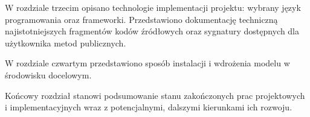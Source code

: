W rozdziale trzecim opisano technologie implementacji projektu: wybrany język programowania oraz frameworki. Przedstawiono dokumentację techniczną najistotniejszych fragmentów kodów źródłowych oraz sygnatury dostępnych dla użytkownika metod publicznych.


W rozdziale czwartym przedstawiono sposób instalacji i wdrożenia modelu w środowisku docelowym.


Końcowy rozdział stanowi podsumowanie stanu zakończonych prac projektowych i implementacyjnych  wraz z potencjalnymi, dalszymi kierunkami ich rozwoju.

